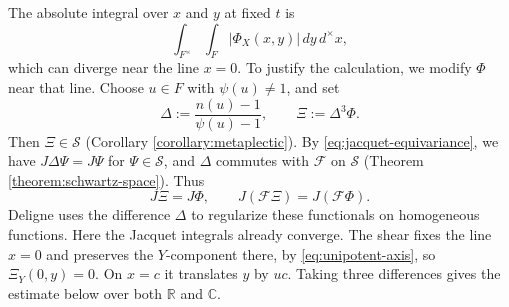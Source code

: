 \documentclass[reqno]{amsart}
\theoremstyle{plain}
\theoremstyle{definition}
\theoremstyle{itplain}
\numberwithin{equation}{section}
\numberwithin{theorem}{section}
\begin{document}
The absolute integral over $x$ and $y$ at fixed $t$ is
\begin{equation}\label{eq:x-integrable}
  \int_{F^\times} \int_F \lvert \Phi_X(x, y) \rvert \, d y \, d^\times x,
\end{equation}
which can diverge near the line $x = 0$.  To justify the calculation, we modify $\Phi$ near that line.  Choose $u \in F$ with $\psi(u) \neq 1$, and set
\begin{equation}\label{eq:shear-difference}
  \Delta := \frac{n(u) - 1}{\psi(u) - 1},
  \qquad
  \Xi := \Delta^3 \Phi.
\end{equation}
Then $\Xi \in \mathcal{S}$ (Corollary \ref{corollary:metaplectic}).  By \eqref{eq:jacquet-equivariance}, we have $J \Delta \Psi = J \Psi$ for $\Psi \in \mathcal{S}$, and $\Delta$ commutes with $\mathcal{F}$ on $\mathcal{S}$ (Theorem \ref{theorem:schwartz-space}).  Thus
\begin{equation}\label{eq:shear-jacquet}
  J \Xi = J \Phi,
  \qquad
  J(\mathcal{F} \Xi) = J(\mathcal{F} \Phi).
\end{equation}
Deligne \cite[(5.15.1)]{SB_1978-1979__21__244_0} uses the difference $\Delta$ to regularize these functionals on homogeneous functions.  Here the Jacquet integrals already converge.  The shear fixes the line $x = 0$ and preserves the $Y$-component there, by \eqref{eq:unipotent-axis}, so $\Xi_Y(0, y) = 0$.  On $x = c$ it translates $y$ by $u c$.  Taking three differences gives the estimate below over both $\mathbb{R}$ and $\mathbb{C}$.
\end{document}
